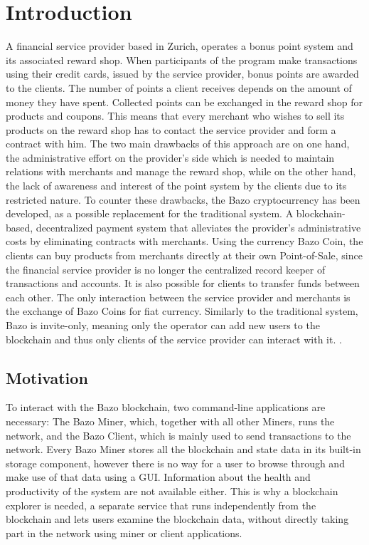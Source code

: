 \chapter{Introduction}
A financial service provider based in Zurich, operates a bonus point system and its associated reward shop. When participants of the program make transactions using their credit cards, issued by the service provider, bonus points are awarded to the clients. The number of points a client receives depends on the amount of money they have spent. Collected points can be exchanged in the reward shop for products and coupons. This means that every merchant who wishes to sell its products on the reward shop has to contact the service provider and form a contract with him. The two main drawbacks of this approach are on one hand, the administrative effort on the provider's side which is needed to maintain relations with merchants and manage the reward shop, while on the other hand, the lack of awareness and interest of the point system by the clients due to its restricted nature.
To counter these drawbacks, the Bazo cryptocurrency has been developed, as a possible replacement for the traditional system. A blockchain-based, decentralized payment system that alleviates the provider's administrative costs by eliminating contracts with merchants. Using the currency Bazo Coin, the clients can buy products from merchants directly at their own Point-of-Sale, since the financial service provider is no longer the centralized record keeper of transactions and accounts. It is also possible for clients to transfer funds between each other. The only interaction between the service provider and merchants is the exchange of Bazo Coins for fiat currency. Similarly to the traditional system, Bazo is invite-only, meaning only the operator can add new users to the blockchain and thus only clients of the service provider can interact with it. \cite{bazo}.

\section{Motivation}
To interact with the Bazo blockchain, two command-line applications are necessary: The Bazo Miner, which, together with all other Miners, runs the network, and the Bazo Client, which is mainly used to send transactions to the network. Every Bazo Miner stores all the blockchain and state data in its built-in storage component, however there is no way for a user to browse through and make use of that data using a GUI. Information about the health and productivity of the system are not available either. This is why a blockchain explorer is needed, a separate service that runs independently from the blockchain and lets users examine the blockchain data, without directly taking part in the network using miner or client applications.

